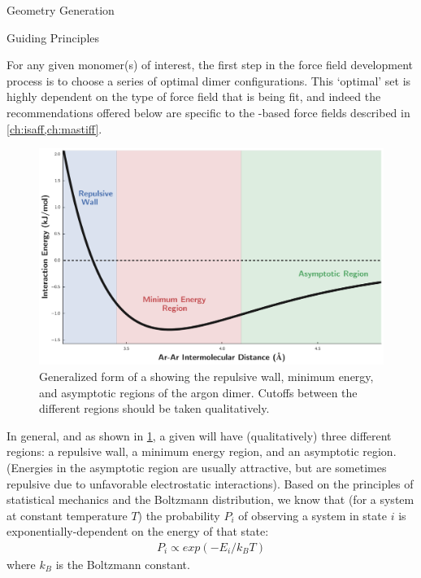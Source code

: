 
\begin{section}{Geometry Generation}
\label{sec:workflow-geometries}


\begin{subsection}{Guiding Principles}


For any given monomer(s) of interest, the first step in the force field
development process is to choose a series of optimal dimer
configurations. This `optimal' set is highly dependent on the type of force field that
is being fit, and indeed the recommendations offered below are specific to the
\sapt-based force fields described in \cref{ch:isaff,ch:mastiff}.

\begin{figure}
\centering
\includegraphics[width=1.0\textwidth]{workflow/generalized_pes.pdf}
\caption[Generalized form of a \pes showing the repulsive wall, minimum
energy, and asymptotic regions.]
        {Generalized form of a \pes showing the repulsive wall, minimum
energy, and asymptotic regions of the argon dimer. Cutoffs between the
different regions should be taken qualitatively.}
\label{fig:workflow-pes}
\end{figure}

In general, and as shown in \cref{fig:workflow-pes}, a given \pes will have
(qualitatively) three different regions: a repulsive wall, a minimum energy
region, and an asymptotic region. (Energies in the asymptotic region are
usually attractive, but are sometimes repulsive due to unfavorable
electrostatic interactions). 
Based on the principles of statistical mechanics and the Boltzmann
distribution, we know that (for a system
at constant temperature $T$) the probability $P_i$ of observing a system in state
$i$ is exponentially-dependent on the energy of that state:\cite{Frenkel2002}
%
\begin{align}
P_i \propto exp(-E_i/k_B T)
\label{eq:workflow-boltzmann}
\end{align}
%
where $k_B$ is the Boltzmann constant.


\end{subsection}
\end{section}
